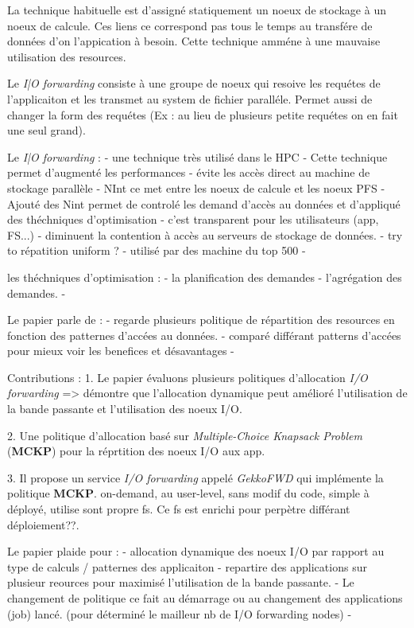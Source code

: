 \documentclass[10pt, a4paper]{article}
\begin{document}
La technique habituelle est d'assigné statiquement un noeux de stockage à un noeux de calcule.
Ces liens ce correspond pas tous le temps au transfére de données d'on l'appication à besoin.
Cette technique amméne à une mauvaise utilisation des resources.


Le \emph{I|O forwarding} consiste à une groupe de noeux qui resoive les requétes de
l'applicaiton et les transmet au system de fichier paralléle. Permet aussi de changer la form
des requétes (Ex : au lieu de plusieurs petite requétes on en fait une seul grand).

Le \emph{I|O forwarding} :
- une technique très utilisé dans le HPC
- Cette technique permet d'augmenté les performances
- évite les accès direct au machine de stockage parallèle
- NInt ce met entre les noeux de calcule et les noeux PFS
- Ajouté des Nint permet de controlé les demand d'accès au données et d'appliqué des théchniques d'optimisation
- c'est transparent pour les utilisateurs (app, FS...)
- diminuent la contention à accès au serveurs de stockage de données.
- try to répatition uniform ?
- utilisé par des machine du top 500
- 


les théchniques d'optimisation :
- la planification des demandes
- l'agrégation des demandes.
-


Le papier parle de :
- regarde plusieurs politique de répartition des resources en fonction des patternes d'accées au données.
- comparé différant patterns d'accées pour mieux voir les benefices et désavantages
- 

Contributions :
1. Le papier évaluons plusieurs politiques d'allocation \emph{I/O forwarding} => démontre que l'allocation dynamique peut amélioré l'utilisation de la bande passante et l'utilisation des noeux I/O.

2. Une politique d'allocation basé sur \emph{Multiple-Choice Knapsack Problem} (\textbf{MCKP}) pour la réprtition des noeux I/O aux app.

3. Il propose un service \emph{I/O forwarding} appelé \emph{GekkoFWD} qui implémente la politique \textbf{MCKP}. on-demand, au user-level, sans modif du code, simple à déployé, utilise sont propre fs.
Ce fs est enrichi pour perpètre différant déploiement??.

Le papier plaide pour :
- allocation dynamique des noeux I/O par rapport au type de calculs / patternes des applicaiton
- repartire des applications sur plusieur reources pour maximisé l'utilisation de la bande passante.
- Le changement de politique ce fait au démarrage ou au changement des applications (job) lancé. (pour déterminé le mailleur nb de I/O forwarding nodes)
- 
\end{document}
